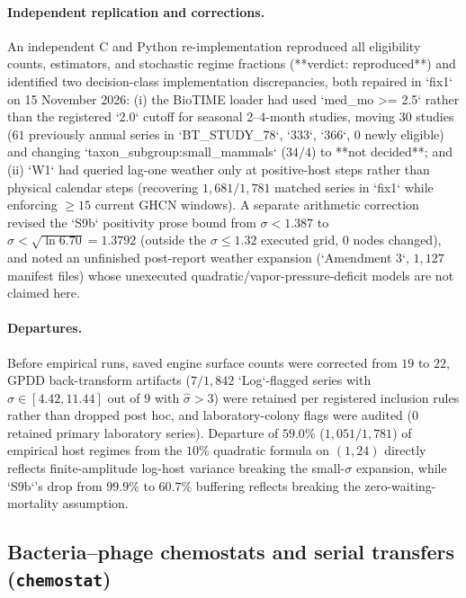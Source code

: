 \paragraph{Independent replication and corrections.}
An independent C and Python re-implementation reproduced all eligibility counts, estimators, and stochastic regime fractions (**verdict: reproduced**) and identified two decision-class implementation discrepancies, both repaired in `fix1` on 15 November 2026: (i) the BioTIME loader had used `med\_mo >= 2.5` rather than the registered `2.0` cutoff for seasonal 2--4-month studies, moving $30$ studies ($61$ previously annual series in `BT\_STUDY\_78`, `333`, `366`, $0$ newly eligible) and changing `taxon\_subgroup:small\_mammals` ($34/4$) to **not decided**; and (ii) `W1` had queried lag-one weather only at positive-host steps rather than physical calendar steps (recovering $1{,}681/1{,}781$ matched series in `fix1` while enforcing $\ge 15$ current GHCN windows). A separate arithmetic correction revised the `S9b` positivity prose bound from $\sigma < 1.387$ to $\sigma < \sqrt{\ln 6.70} = 1.3792$ (outside the $\sigma \le 1.32$ executed grid, $0$ nodes changed), and noted an unfinished post-report weather expansion (`Amendment 3`, $1{,}127$ manifest files) whose unexecuted quadratic/vapor-pressure-deficit models are not claimed here.

\paragraph{Departures.}
Before empirical runs, saved engine surface counts were corrected from $19$ to $22$, GPDD back-transform artifacts ($7/1{,}842$ `Log`-flagged series with $\hat{\sigma} \in [4.42, 11.44]$ out of $9$ with $\hat{\sigma} > 3$) were retained per registered inclusion rules rather than dropped post hoc, and laboratory-colony flags were audited ($0$ retained primary laboratory series). Departure of $59.0\%$ ($1{,}051/1{,}781$) of empirical host regimes from the $10\%$ quadratic formula on $(1, 24)$ directly reflects finite-amplitude log-host variance breaking the small-$\sigma$ expansion, while `S9b`'s drop from $99.9\%$ to $60.7\%$ buffering reflects breaking the zero-waiting-mortality assumption.

\subsection{Bacteria--phage chemostats and serial transfers (\texttt{chemostat})}\label{num-esm-chemostat}

